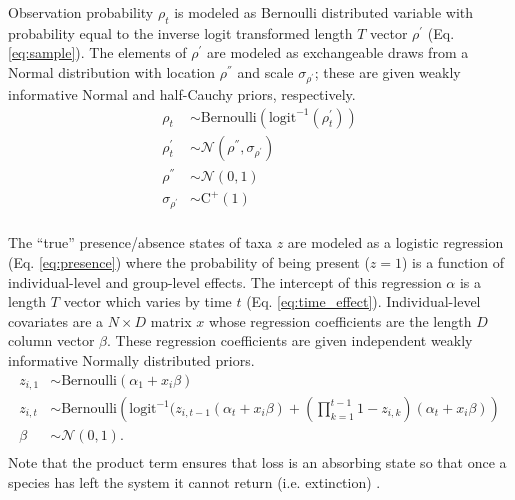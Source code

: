 \documentclass[12pt,letterpaper]{article}
\begin{document}
Observation probability \(\rho_{t}\) is modeled as Bernoulli distributed variable with probability equal to the inverse logit transformed length \(T\) vector \(\rho^{\prime}\) (Eq. \ref{eq:sample}). The elements of \(\rho^{\prime}\) are modeled as exchangeable draws from a Normal distribution with location \(\rho^{''}\) and scale \(\sigma_{\rho^{\prime}}\); these are given weakly informative Normal and half-Cauchy priors, respectively.
\begin{equation}
  \begin{aligned}
    \rho_{t} &\sim \text{Bernoulli}\left(\text{logit}^{-1}(\rho^{\prime}_{t})\right) \\
    \rho^{\prime}_{t} &\sim \mathcal{N}(\rho^{''}, \sigma_{\rho^{\prime}}) \\
    \rho^{''} &\sim \mathcal{N}(0, 1) \\
    \sigma_{\rho^{\prime}} &\sim \text{C}^{+}(1) \\
  \end{aligned}
  \label{eq:sample}
\end{equation}


The ``true'' presence/absence states of taxa \(z\) are modeled as a logistic regression (Eq. \ref{eq:presence}) where the probability of being present (\(z = 1\)) is a function of individual-level and group-level effects. The intercept of this regression \(\alpha\) is a length \(T\) vector which varies by time \(t\) (Eq. \ref{eq:time_effect}). Individual-level covariates are a \(N \times D\) matrix \(x\) whose regression coefficients are the length \(D\) column vector \(\beta\). These regression coefficients are given independent weakly informative Normally distributed priors. 
\begin{equation}
  \begin{aligned}
    z_{i,1} &\sim \text{Bernoulli}(\alpha_{1} + x_{i} \beta) \\
    z_{i,t} &\sim \text{Bernoulli}\left(\text{logit}^{-1}(z_{i,t-1} (\alpha_{t} + x_{i} \beta) + \left(\prod_{k = 1}^{t-1} 1 - z_{i,k}\right) (\alpha_{t} + x_{i} \beta)\right) \\
    \beta &\sim \mathcal{N}(0, 1). \\
  \end{aligned}
  \label{eq:presence}
\end{equation}
Note that the product term ensures that loss is an absorbing state so that once a species has left the system it cannot return (i.e. extinction) \citep{Royle2008}.
\end{document}
